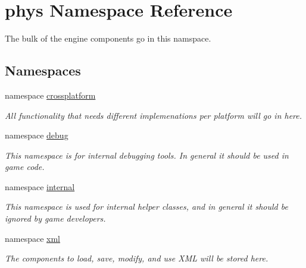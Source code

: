 \hypertarget{namespacephys}{
\section{phys Namespace Reference}
\label{df/dec/namespacephys}
}


The bulk of the engine components go in this namspace.  


\subsection*{Namespaces}
\begin{DoxyCompactItemize}
\item 
namespace \hyperlink{namespacephys_1_1crossplatform}{crossplatform}


\begin{DoxyCompactList}\small\item\em All functionality that needs different implemenations per platform will go in here. \item\end{DoxyCompactList}

\item 
namespace \hyperlink{namespacephys_1_1debug}{debug}


\begin{DoxyCompactList}\small\item\em This namespace is for internal debugging tools. In general it should be used in game code. \item\end{DoxyCompactList}

\item 
namespace \hyperlink{namespacephys_1_1internal}{internal}


\begin{DoxyCompactList}\small\item\em This namespace is used for internal helper classes, and in general it should be ignored by game developers. \item\end{DoxyCompactList}

\item 
namespace \hyperlink{namespacephys_1_1xml}{xml}


\begin{DoxyCompactList}\small\item\em The components to load, save, modify, and use XML will be stored here. \item\end{DoxyCompactList}

\end{DoxyCompactItemize}
